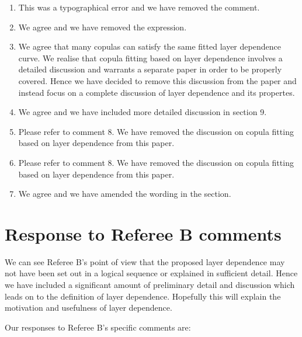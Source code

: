 \documentclass[a4paper, 12pt]{report}
\begin{document}
\begin{enumerate}
\item This was a typographical error and we have removed the comment.

\item	We agree and we have removed the expression.

\item	We agree that many copulas can satisfy the same fitted layer dependence curve. We realise that copula fitting based on layer dependence involves a detailed discussion and warrants a separate paper in order to be properly covered. Hence we have decided to remove this discussion from the paper and instead focus on a complete discussion of layer dependence and its propertes.

\item	We agree and we have included more detailed discussion in section 9.

\item	Please refer to comment 8. We have removed the discussion on copula fitting based on layer dependence from this paper.

\item	Please refer to comment 8. We have removed the discussion on copula fitting based on layer dependence from this paper.

\item	We agree and we have amended the wording in the section.

\end{enumerate}


\newpage

\section*{Response to Referee B comments}

We can see Referee B's point of view that the proposed layer dependence may not have been set out in a logical sequence or explained in sufficient detail. Hence we have included a significant amount of preliminary detail and discussion which leads on to the definition of layer dependence. Hopefully this will explain the motivation and usefulness of layer dependence.

Our responses to Referee B's specific comments are:
\end{document}

